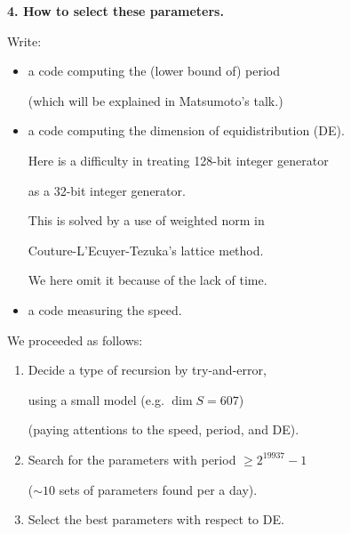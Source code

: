 \documentclass[a4j,12pt,landscape]{jarticle}
\begin{document}
\newpage
{\bf 4. How to select these parameters.}

Write: 
\begin{itemize}
\item a code computing the (lower bound of) period

(which will be explained in Matsumoto's talk.)
\item  a code computing the dimension of equidistribution (DE).

Here is a difficulty in treating 128-bit integer generator 

as a 32-bit integer generator.

This is solved by a use of weighted norm in 

Couture-L'Ecuyer-Tezuka's lattice method.
 
We here omit it 
because of the lack of time.
%

\item a code measuring the speed.
\end{itemize}

\newpage
We proceeded as follows:
\begin{enumerate}
\item 
Decide a type of recursion by try-and-error,

using a small model (e.g. $\dim S = 607$)

(paying attentions to the speed, period, and DE).
\item
Search for the parameters 
with period $\geq 2^{19937}-1$ 

($\sim 10$ sets of parameters found per a day).
\item
Select the best parameters with respect to DE.
\end{enumerate}
\end{document}
